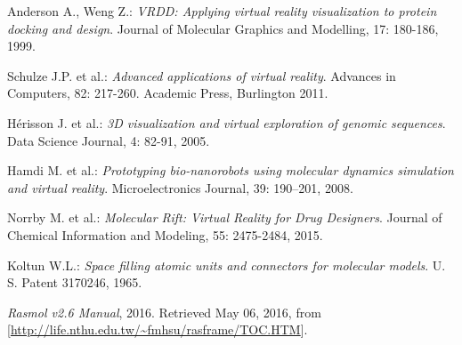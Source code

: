 \begin{thebibliography}{99}
 Anderson A., Weng Z.: \emph{VRDD: Applying virtual reality visualization to protein docking and design}. Journal of Molecular Graphics and Modelling, 17: 180-186, 1999.

 Schulze J.P. et al.: \emph{Advanced applications of virtual reality}. Advances in Computers, 82: 217-260. Academic Press, Burlington 2011.

 Hérisson J. et al.: \emph{3D visualization and virtual exploration of genomic sequences}. Data Science Journal, 4: 82-91, 2005.

 Hamdi M. et al.: \emph{Prototyping bio-nanorobots using molecular dynamics simulation and virtual reality}. Microelectronics Journal, 39: 190–201, 2008.

 Norrby M. et al.: \emph{Molecular Rift: Virtual Reality for Drug Designers}. Journal of Chemical Information and Modeling, 55: 2475-2484, 2015.

 Koltun W.L.: \emph{Space filling atomic units and connectors for molecular models}. U. S. Patent 3170246, 1965.

 \emph{Rasmol v2.6 Manual}, 2016. Retrieved May 06, 2016, from [\url{http://life.nthu.edu.tw/~fmhsu/rasframe/TOC.HTM}].


\end{thebibliography}